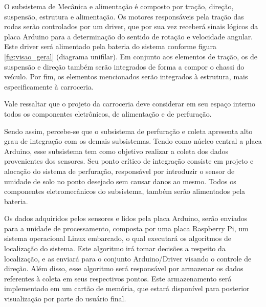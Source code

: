 
O subsistema de Mecânica e alimentação é composto por tração, direção, suspensão, estrutura e alimentação. Os motores
responsáveis pela tração das rodas serão controlados por um driver, que por sua vez receberá sinais lógicos da placa Arduino
para a determinação do sentido de rotação e velocidade angular. Este driver será alimentado pela bateria do sistema conforme
figura \ref{fig:visao_geral} (diagrama unifilar). Em conjunto aos elementos de tração, os de suspensão e direção também serão integrados de forma
a compor o chassi do veículo. Por fim, os elementos mencionados serão integrados à estrutura, mais especificamente à carroceria.

Vale ressaltar que o projeto da carroceria deve considerar em seu espaço interno todos os componentes eletrônicos, de
alimentação e de perfuração.

Sendo assim, percebe-se que o subsistema de perfuração e coleta apresenta alto grau de integração com os demais subsistemas.
Tendo como núcleo central a placa Arduino, esse subsistema tem como objetivo realizar a coleta dos dados provenientes dos
sensores. Seu ponto crítico de integração consiste em projeto e alocação do sistema de perfuração, responsável por introduzir
o sensor de umidade de solo no ponto desejado sem causar danos ao mesmo. Todos os componentes eletromecânicos do subsistema,
também serão alimentados pela bateria.


Os dados adquiridos pelos sensores e lidos pela placa Arduino, serão enviados para a unidade de processamento, composta por
uma placa Raspberry Pi, um sistema operacional Linux embarcado, o qual executará os algoritmos de localização do sistema. Este
algoritmo irá tomar decisões a respeito da localização, e as enviará para o conjunto Arduino/Driver visando o controle de
direção. Além disso, esse algoritmo será responsável por armazenar os dados referentes à coleta em seus respectivos
pontos. Este armazenamento será implementado em um cartão de memória, que estará disponível para posterior visualização por
parte do usuário final.
